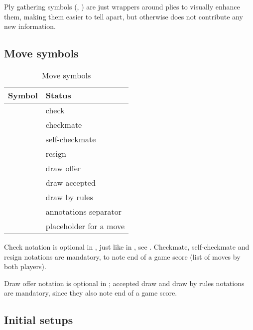 Ply gathering symbols (\alg{[}, \alg{]}) are just wrappers around plies to visually
enhance them, making them easier to tell apart, but otherwise does not contribute any
new information.

\clearpage %

\subsection*{Move symbols}
\label{sec:Appendix/Summary/Move symbols}

\begin{table}[!h]
\centering
\begin{tabular}{ rl }
\toprule
\textbf{Symbol}      & \textbf{Status}                \\
\midrule
\alg{+}              & check                          \\
\alg{\#}             & checkmate                      \\
\alg{\#}             & self-checkmate                 \\
\alg{\#\#}           & resign                         \\ \cmidrule{1-2}
\alg{(=)}            & draw offer                     \\
\alg{(==)}           & draw accepted                  \\
\alg{(===)}          & draw by rules                  \\ \cmidrule{1-2}
\alg{\_}             & annotations separator          \\
\alg{...}            & placeholder for a move         \\
\bottomrule
\end{tabular}
\caption{Move symbols}
\label{tbl:Appendix/Summary/Move symbols}
\end{table}

Check notation is optional in , just like in , see
. Checkmate, self-checkmate and resign notations are mandatory,
to note end of a game score (list of moves by both players).

Draw offer notation is optional in ; accepted draw and draw by
rules notations are mandatory, since they also note end of a game score.

\clearpage %

\subsection*{Initial setups}
\label{sec:Appendix/Summary/Initial setups}

